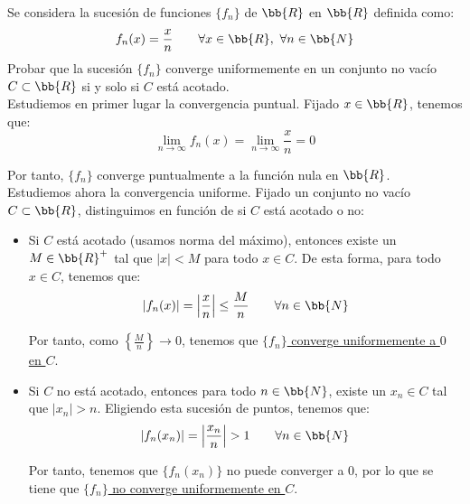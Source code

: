 \begin{ejercicio}
    Se considera la sucesión de funciones $\{f_n\}$ de $\bb{R}$ en $\bb{R}$ definida como:
    \begin{equation*}
        f_n(x) = \frac{x}{n} \qquad \forall x\in \bb{R},~\forall n\in \bb{N}
    \end{equation*}
    Probar que la sucesión $\{f_n\}$ converge uniformemente en un conjunto no vacío $C\subset \bb{R}$ si y solo si $C$ está acotado.\\

    Estudiemos en primer lugar la convergencia puntual. Fijado $x\in \bb{R}$, tenemos que:
    \begin{equation*}
        \lim_{n\to \infty} f_n(x) = \lim_{n\to \infty} \frac{x}{n} = 0
    \end{equation*}

    Por tanto, $\{f_n\}$ converge puntualmente a la función nula en $\bb{R}$.\\

    Estudiemos ahora la convergencia uniforme. Fijado un conjunto no vacío $C\subset \bb{R}$, distinguimos en función de si $C$ está acotado o no:
    \begin{itemize}
        \item Si $C$ está acotado (usamos norma del máximo), entonces existe un $M\in \bb{R}^+$ tal que $|x|<M$ para todo $x\in C$. De esta forma, para todo $x\in C$, tenemos que:
        \begin{equation*}
            |f_n(x)| = \left|\frac{x}{n}\right| \leq \frac{M}{n} \qquad \forall n\in \bb{N}
        \end{equation*}

        Por tanto, como $\left\{\frac{M}{n}\right\}\to 0$, tenemos que \ul{$\{f_n\}$ converge uniformemente a $0$ en $C$}.

        \item Si $C$ no está acotado, entonces para todo $n\in \bb{N}$, existe un $x_n\in C$ tal que $|x_n|>n$. Eligiendo esta sucesión de puntos, tenemos que:
        \begin{equation*}
            |f_n(x_n)| = \left|\frac{x_n}{n}\right| > 1 \qquad \forall n\in \bb{N}
        \end{equation*}

        Por tanto, tenemos que $\{f_n(x_n)\}$ no puede converger a $0$, por lo que se tiene que \ul{$\{f_n\}$ no converge uniformemente en $C$}.
    \end{itemize}
\end{ejercicio}


